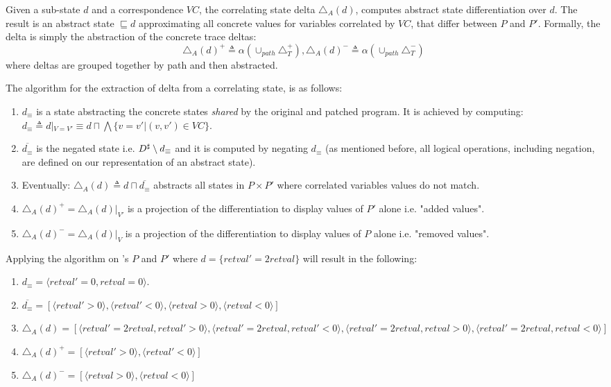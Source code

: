 \begin{definition}  
Given a sub-state $d$ and a correspondence $VC$, the correlating state delta $\triangle_{A}(d)$, computes abstract state differentiation over $d$. The result is an abstract state $\sqsubseteq d$ approximating all concrete values for variables correlated by $VC$, that differ between $P$ and $P'$. Formally, the delta is simply the abstraction of the concrete trace deltas:
\[
\triangle_{A}(d)^{+} \triangleq \alpha(\cup_{path}\triangle_{T}^{+}) ,
\triangle_{A}(d)^{-} \triangleq \alpha(\cup_{path}\triangle_{T}^{-})
\]
where deltas are grouped together by path and then abstracted.
\end{definition}
The algorithm for the extraction of delta from a correlating state, is as follows:
\begin{enumerate}
\item $d_{\equiv}$ is a state abstracting the concrete states \emph{shared} by the original and patched program. It is achieved by computing: $d_{\equiv} \triangleq d|_{V=V'} \equiv d \sqcap \bigwedge\{ v = v' | (v,v') \in VC \}$.
\item $\overline{d_{\equiv}}$ is the negated state i.e. $D^\sharp \setminus d_{\equiv}$ and it is computed by negating $d_{\equiv}$ (as mentioned before, all logical operations, including negation, are defined on our representation of an abstract state).
\item Eventually: $\triangle_{A}(d) \triangleq d \sqcap \overline{d_{\equiv}}$ abstracts all states in $P \times P'$ where correlated variables values do not match.
\item $\triangle_{A}(d)^{+} = \triangle_{A}(d)|_{V'}$ is a projection of the differentiation to display values of $P'$ alone i.e. "added values".
\item $\triangle_{A}(d)^{-} = \triangle_{A}(d)|_{V}$ is a projection of the differentiation to display values of $P$ alone i.e. "removed values".
\end{enumerate}
\begin{Example}
Applying the algorithm on 's $P$ and $P'$ where $d = \{ retval' = 2retval \}$ will result in the following:
\begin{enumerate}
\item $d_{\equiv} = \langle retval' = 0, retval = 0 \rangle$.
\item $\overline{d_{\equiv}} = [ \langle retval' > 0 \rangle, \langle retval' < 0 \rangle, \langle retval > 0 \rangle, \langle retval < 0 \rangle ]$
\item $\triangle_{A}(d)  = [ \langle retval' = 2retval, retval' > 0 \rangle, \langle retval' = 2retval, retval' < 0 \rangle, \langle retval' = 2retval, retval > 0 \rangle, \langle retval' = 2retval, retval < 0 \rangle ]$
\item $\triangle_{A}(d)^{+} = [ \langle retval' > 0 \rangle, \langle retval' < 0 \rangle ]$
\item $\triangle_{A}(d)^{-} = [\langle retval > 0 \rangle, \langle retval < 0 \rangle]$
\end{enumerate}
\end{Example}
